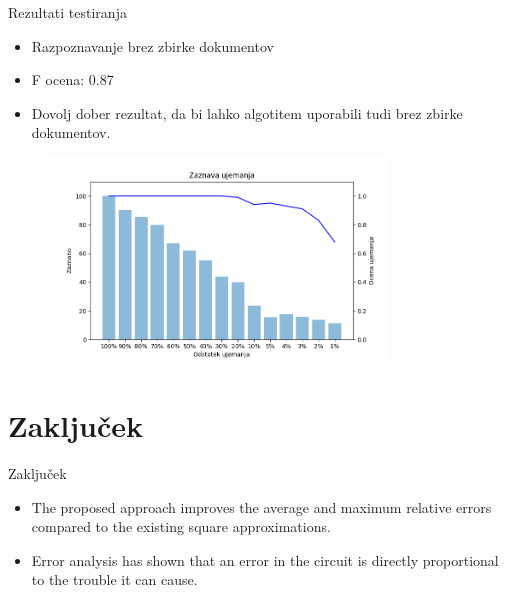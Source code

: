 \documentclass[xcolor=dvipsnames,compress]{beamer}
\begin{document}
\begin{frame}{Rezultati testiranja}
    \begin{itemize}
        \item Razpoznavanje brez zbirke dokumentov
        \item F ocena: 0.87
        \item Dovolj dober rezultat, da bi lahko algotitem uporabili tudi brez zbirke dokumentov.
    \end{itemize}
    
    \begin{figure}[ht!]
        \label{fig:subfigures}
        \begin{center}
            \includegraphics[width=0.8\textwidth]{figs/brez_courpusa.png}
        \end{center}
    \end{figure}
    
\end{frame}




\section{Zaključek}
\label{sec:zakljucek}

\begin{frame}{Zaključek}
\begin{itemize}
	\item The proposed approach improves the average and maximum relative errors compared to the existing square approximations.
	\pause
	\item Error analysis has shown that an error in the circuit is directly proportional to the trouble it can cause.
\end{itemize}
\end{frame}
\end{document}
